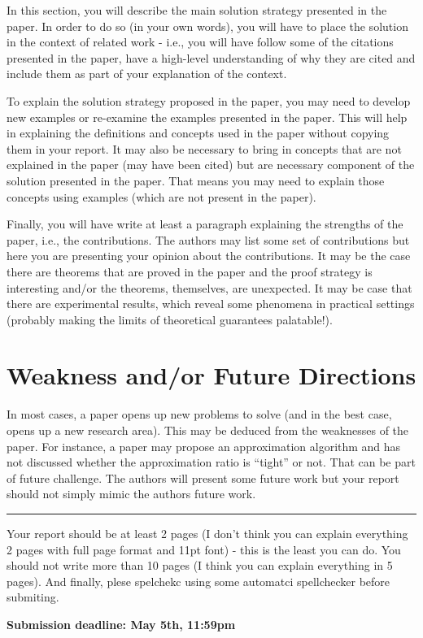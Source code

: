 \documentclass[11pt]{article}
\begin{document}
In this section, you will describe the main solution strategy
presented in the paper. In order to do so (in your own words), you
will have to place the solution in the context of related work - i.e.,
you will have follow some of the citations presented in the paper,
have a high-level understanding of why they are cited and include
them as part of your explanation of the context. 

To explain the solution strategy proposed in the paper, you may need
to develop new examples or re-examine the examples presented in the
paper. This will help in explaining the definitions and concepts used
in the paper without copying them in your report.  It may also be
necessary to bring in concepts that are not explained in the paper
(may have been cited) but are necessary component of the solution
presented in the paper. That means you may need to explain those
concepts using examples (which are not present in the paper).

Finally, you will have write at least a paragraph explaining the
strengths of the paper, i.e., the contributions. The authors may list
some set of contributions but here you are presenting your opinion
about the contributions. It may be the case there are theorems that
are proved in the paper and the proof strategy is interesting and/or
the theorems, themselves, are unexpected.  It may be case that there
are experimental results, which reveal some phenomena in practical
settings (probably making the limits of theoretical guarantees
palatable!).

\section{Weakness and/or Future Directions}
\label{sec:future}

In most cases, a paper opens up new problems to solve (and in the best
case, opens up a new research area). This may be deduced from the
weaknesses of the paper. For instance, a paper may propose an
approximation algorithm and has not discussed whether the
approximation ratio is ``tight'' or not.  That can be part of future
challenge. The authors will present some future work but your report
should not simply mimic the authors future work.


\bigskip
\hrule
\medskip
Your report should be at least 2 pages (I don't think you can explain
everything 2 pages with full page format and 11pt font) - this is the
least you can do. You should not write more than 10 pages (I think you
can explain everything in 5 pages).  And finally, plese spelchekc
using some automatci spellchecker before submiting.

\textbf{Submission deadline: May 5th, 11:59pm}
\end{document}
